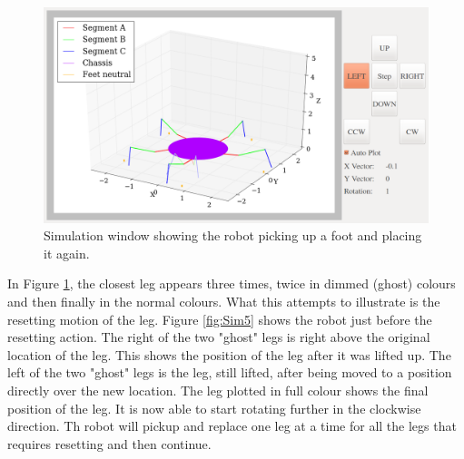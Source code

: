 \begin{figure}[H]
\centering
\includegraphics[scale = 0.33]{pics/Sim6.png}
\caption{Simulation window showing the robot picking up a foot and placing it again.}
\label{fig:Sim6}
\end{figure}

In Figure \ref{fig:Sim6}, the closest leg appears three times, twice in dimmed (ghost) colours and then finally in the normal colours. What this attempts to illustrate is the resetting motion of the leg. Figure \ref{fig:Sim5} shows the robot just before the resetting action. The right of the two "ghost" legs is right above the original location of the leg. This shows the position of the leg after it was lifted up. The left of the two "ghost" legs is the leg, still lifted, after being moved to a position directly over the new location. The leg plotted in full colour shows the final position of the leg. It is now able to start rotating further in the clockwise direction. Th robot will pickup and replace one leg at a time for all the legs that requires resetting and then continue.
